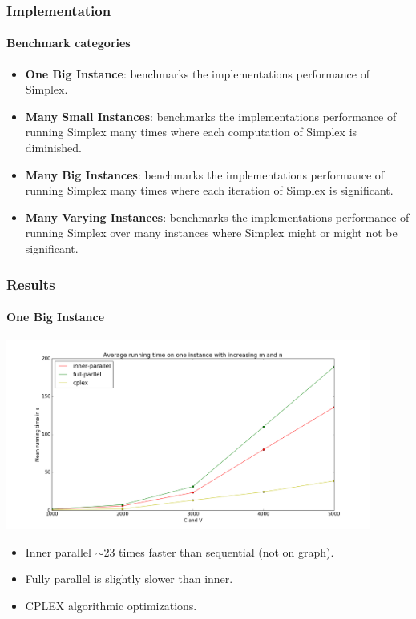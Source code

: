 \documentclass{beamer}
\begin{document}
\begin{frame}
\frametitle{Implementation}
\framesubtitle{Benchmark categories}
\begin{itemize}
	\item \textbf{One Big Instance}: benchmarks the implementations performance of Simplex.
	
	\item \textbf{Many Small Instances}: benchmarks the implementations performance of running Simplex many times where each computation of Simplex is diminished.
	
	\item \textbf{Many Big Instances}: benchmarks the implementations performance of running Simplex many times where each iteration of Simplex is significant.
	
	\item \textbf{Many Varying Instances}: benchmarks the implementations performance of running Simplex over many instances where Simplex might or might not be significant.
\end{itemize}
\end{frame}

\begin{frame}[fragile]
\frametitle{Results}
\framesubtitle{One Big Instance}
\centering
\includegraphics[width=0.9\textwidth]{../Doc/figures/one-big-new}
\begin{itemize}
	\item Inner parallel $\sim$23 times faster than sequential (not on graph).
	\item Fully parallel is slightly slower than inner.
	\item CPLEX algorithmic optimizations.
\end{itemize}
\end{frame}
\end{document}
